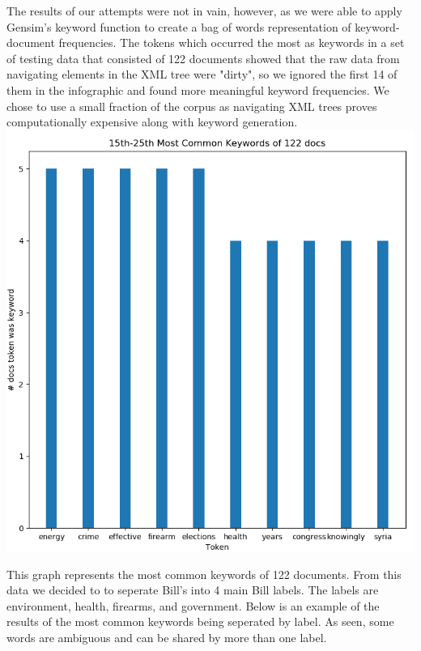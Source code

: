 \documentclass[11pt,a4paper]{article}
\begin{document}
  The results of our attempts were not in vain, however, as we were able to apply Gensim's keyword function to create a bag of words representation of keyword-document frequencies. The tokens which occurred the most as keywords in a set of testing data that consisted of 122 documents showed that the raw data from navigating elements in the XML tree were "dirty", so we ignored the first 14 of them in the infographic and found more meaningful keyword frequencies. We chose to use a small fraction of the corpus as navigating XML trees proves computationally expensive along with keyword generation.\\
  \includegraphics[scale=0.5]{test_kw-mostcommon_15-25}
  
  This graph represents the most common keywords of 122 documents. From this data we decided to to seperate Bill's into 4 main Bill labels. The labels are environment, health, firearms, and government. Below is an example of the results of the most common keywords being seperated by label. As seen, some words are ambiguous and can be shared by more than one label.  
  
\end{document}
